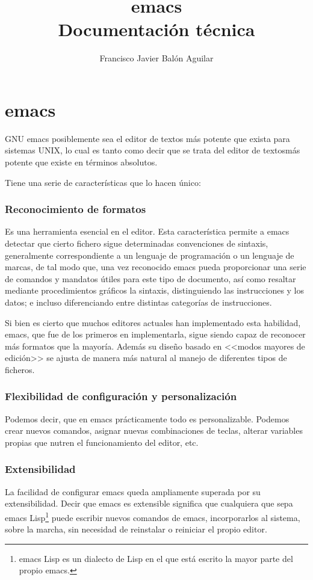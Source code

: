 \documentclass[a4paper, 11pt, titlepage]{article}
\title{\textbf{emacs}\\ Documentación técnica}
\author{Francisco Javier Balón Aguilar}
\begin{document}
\maketitle
\renewcommand{\contentsname}{Índice}
\tableofcontents
\newpage

\section{emacs}

    GNU emacs posiblemente sea el editor de textos más potente que exista 
    para sistemas UNIX, lo cual es tanto como decir que se trata del 
    editor de textosmás potente que existe en términos absolutos.

    Tiene una serie de características que lo hacen único:

    \subsubsection{Reconocimiento de formatos} Es una herramienta esencial en 
    el editor. Esta característica permite a emacs detectar que cierto fichero 
    sigue determinadas convenciones de sintaxis, generalmente correspondiente a 
    un lenguaje de programación o un lenguaje de marcas, de tal modo que, una vez 
    reconocido emacs pueda proporcionar una serie de comandos y mandatos útiles 
    para este tipo de documento, así como resaltar mediante procedimientos gráficos 
    la sintaxis, distinguiendo las instrucciones y los datos; e incluso 
    diferenciando entre distintas categorías de instrucciones.

    Si bien es cierto que muchos editores actuales han implementado esta habilidad, 
    emacs, que fue de los primeros en implementarla, sigue siendo capaz de reconocer 
    más formatos que la mayoría. Además su diseño basado en <<modos mayores de edición>>
    se ajusta de manera más natural al manejo de diferentes tipos de ficheros.

    \subsubsection{Flexibilidad de configuración y personalización} Podemos decir, 
    que en emacs prácticamente todo es personalizable. Podemos crear nuevos comandos, 
    asignar nuevas combinaciones de teclas, alterar variables propias que nutren el 
    funcionamiento del editor, etc. 

    \subsubsection{Extensibilidad} La facilidad de configurar emacs queda ampliamente 
    superada por su extensibilidad. Decir que emacs es extensible significa que 
    cualquiera que sepa emacs Lisp\footnote{emacs Lisp es un dialecto de Lisp en el que está escrito 
    la mayor parte del propio emacs.} puede escribir nuevos comandos de emacs, incorporarlos al 
    sistema, sobre la marcha, sin necesidad de reinstalar o reiniciar el propio editor.
\end{document}
